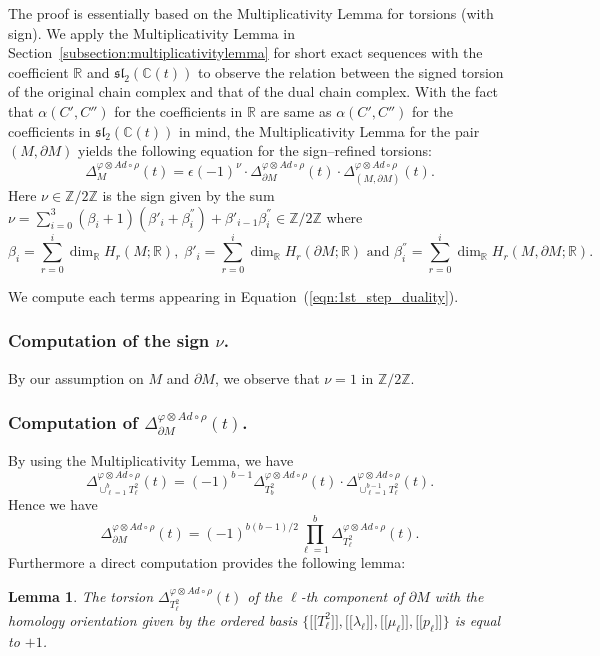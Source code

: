 \documentclass[a4paper]{amsart}
\theoremstyle{plain}
\newtheorem{lemma}[theorem]{Lemma}%
\theoremstyle{definition}
\theoremstyle{remark}
\newcommand{\ZZ}{{\mathbb Z}}
\newcommand{\CC}{{\mathbb C}}
\newcommand{\IR}{{\mathbb R}}
\newcommand{\sllt}{\mathfrak{sl}_2(\CC(t))}
\newcommand{\PolyTors}[2]{\Delta_{#1}^{#2}}
\newcommand{\otAd}[2]{#1 \otimes Ad \circ #2}
\newcommand{\bbrack}[1]{\lbrack \! \lbrack #1 \rbrack \! \rbrack}
\newcommand{\bord}{\partial}
\begin{document}
The proof is essentially based on the Multiplicativity Lemma for
torsions (with sign).  We apply the Multiplicativity Lemma in
Section~\ref{subsection:multiplicativitylemma} for short exact
sequences with the coefficient $\IR$ and $\sllt$ to observe
the relation between the signed torsion of the original chain complex
and that of the dual chain complex.  
With the fact that
$\alpha(C', C'')$ for the coefficients in $\IR$ are same as $\alpha(C',
C'')$ for the coefficients in $\sllt$ in mind, 
the Multiplicativity Lemma for the pair $(M, \bord M)$ yields the following equation for 
the sign--refined torsions:
\begin{equation}\label{eqn:1st_step_duality}
  \PolyTors{M}{\otAd{\varphi}{\rho}}(t)
  =\epsilon(-1)^{\nu}\cdot
  \PolyTors{\bord M}{\otAd{\varphi}{\rho}}(t) \cdot
  \PolyTors{(M, \bord M)}{\otAd{\varphi}{\rho}}(t).
\end{equation}
Here $\nu \in \ZZ/2\ZZ$ is the sign given by the sum
$\nu = 
\sum_{i=0}^3 (\beta_i+1)(\beta'_i+\beta^{''}_i)+\beta'_{i-1}\beta^{''}_i 
\in \ZZ/2\ZZ$ where
$$\beta_i = 
\sum_{r=0}^i \dim_{\IR}H_r(M;\IR), \;\beta'_i = \sum_{r=0}^i
\dim_{\IR}H_r(\bord M;\IR) \text{ and } \beta^{''}_i = \sum_{r=0}^i
\dim_{\IR}H_r(M, \bord M;\IR).
$$

We compute each terms appearing in Equation~(\ref{eqn:1st_step_duality}).

\subsubsection{Computation of the sign $\nu$.}

By our assumption on $M$ and $\bord M$, we observe that $\nu = 1$
in $\ZZ/2\ZZ$.

\subsubsection{Computation of $\PolyTors{\bord M}{\otAd{\varphi}{\rho}}(t)$.}

By using the Multiplicativity Lemma, we have 
\[
\PolyTors{\cup_{\ell=1}^b T^2_\ell}{\otAd{\varphi}{\rho}}(t) 
= (-1)^{b-1}
\PolyTors{T^2_b}{\otAd{\varphi}{\rho}}(t)
\cdot
\PolyTors{\cup_{\ell=1}^{b-1} T^2_\ell}{\otAd{\varphi}{\rho}}(t).
\]
Hence we have
$$
  \PolyTors{\bord M}{\otAd{\varphi}{\rho}}(t) = 
  (-1)^{b(b-1)/2}
  \prod_{\ell=1}^b
  \PolyTors{T^2_\ell}{\otAd{\varphi}{\rho}}(t).
$$
Furthermore a direct computation provides the following lemma:
\begin{lemma}\label{lemma:Torus}
  The torsion $\PolyTors{T^2_\ell}{\otAd{\varphi}{\rho}}(t)$ of the
  $\ell$-th component of $\bord M$ with the homology orientation given by
  the ordered basis $\{\bbrack{T^2_\ell}, \bbrack{\lambda_\ell},
  \bbrack{\mu_\ell},\bbrack{p_\ell}\}$ is equal to $+1$.
\end{lemma}
\end{document}
